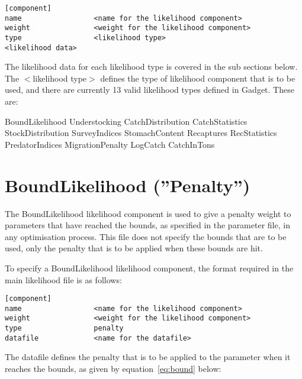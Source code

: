 \documentclass [a4paper, 10pt]{book}
\begin{document}
{\small\begin{verbatim}
[component]
name                 <name for the likelihood component>
weight               <weight for the likelihood component>
type                 <likelihood type>
<likelihood data>
\end{verbatim}}

The likelihood data for each likelihood type is covered in the sub sections below.  The $<$likelihood type$>$ defines the type of likelihood component that is to be used, and there are currently 13 valid likelihood types defined in Gadget.  These are:

\bigskip
BoundLikelihood\newline
Understocking\newline
CatchDistribution\newline
CatchStatistics\newline
StockDistribution\newline
SurveyIndices\newline
StomachContent\newline
Recaptures\newline
RecStatistics\newline
PredatorIndices\newline
MigrationPenalty\newline
LogCatch\newline
CatchInTons

\section{BoundLikelihood (''Penalty'')}\label{sec:boundlike}
The BoundLikelihood likelihood component is used to give a penalty weight to parameters that have reached the bounds, as specified in the parameter file, in any optimisation process.  This file does not specify the bounds that are to be used, only the penalty that is to be applied when these bounds are hit.

\bigskip
To specify a BoundLikelihood likelihood component, the format required in the main likelihood file is as follows:

{\small\begin{verbatim}
[component]
name                 <name for the likelihood component>
weight               <weight for the likelihood component>
type                 penalty
datafile             <name for the datafile>
\end{verbatim}}

The datafile defines the penalty that is to be applied to the parameter when it reaches the bounds, as given by equation~\ref{eq:bound} below:
\end{document}
